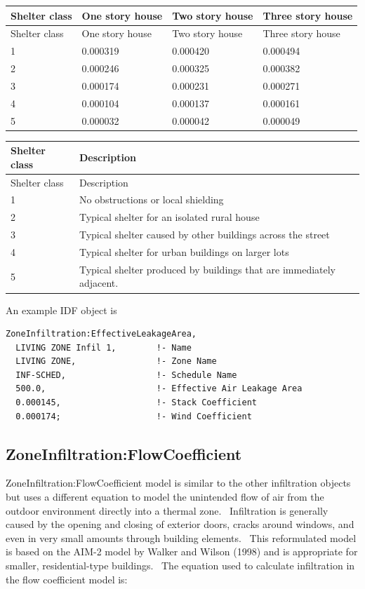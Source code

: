 \begin{longtable}[c]{@{}llll@{}}
\toprule
Shelter class & One story house & Two story house & Three story house \tabularnewline
\midrule
\endfirsthead

\toprule
Shelter class & One story house & Two story house & Three story house \tabularnewline
\midrule
\endhead

1 & 0.000319 & 0.000420 & 0.000494 \tabularnewline
2 & 0.000246 & 0.000325 & 0.000382 \tabularnewline
3 & 0.000174 & 0.000231 & 0.000271 \tabularnewline
4 & 0.000104 & 0.000137 & 0.000161 \tabularnewline
5 & 0.000032 & 0.000042 & 0.000049 \tabularnewline
\bottomrule
\end{longtable}

\begin{longtable}[c]{p{1.5in}p{4.5in}}
\toprule
Shelter class & Description \tabularnewline
\midrule
\endfirsthead

\toprule
Shelter class & Description \tabularnewline
\midrule
\endhead

1 & No obstructions or local shielding \tabularnewline
2 & Typical shelter for an isolated rural house \tabularnewline
3 & Typical shelter caused by other buildings across the street \tabularnewline
4 & Typical shelter for urban buildings on larger lots \tabularnewline
5 & Typical shelter produced by buildings that are immediately adjacent. \tabularnewline
\bottomrule
\end{longtable}

An example IDF object is

\begin{lstlisting}
ZoneInfiltration:EffectiveLeakageArea,
  LIVING ZONE Infil 1,        !- Name
  LIVING ZONE,                !- Zone Name
  INF-SCHED,                  !- Schedule Name
  500.0,                      !- Effective Air Leakage Area
  0.000145,                   !- Stack Coefficient
  0.000174;                   !- Wind Coefficient
\end{lstlisting}

\subsection{ZoneInfiltration:FlowCoefficient}\label{zoneinfiltrationflowcoefficient}

ZoneInfiltration:FlowCoefficient model is similar to the other infiltration objects but uses a different equation to model the unintended flow of air from the outdoor environment directly into a thermal zone.~ Infiltration is generally caused by the opening and closing of exterior doors, cracks around windows, and even in very small amounts through building elements.~ This reformulated model is based on the AIM-2 model by Walker and Wilson (1998) and is appropriate for smaller, residential-type buildings.~ The equation used to calculate infiltration in the flow coefficient model is:

